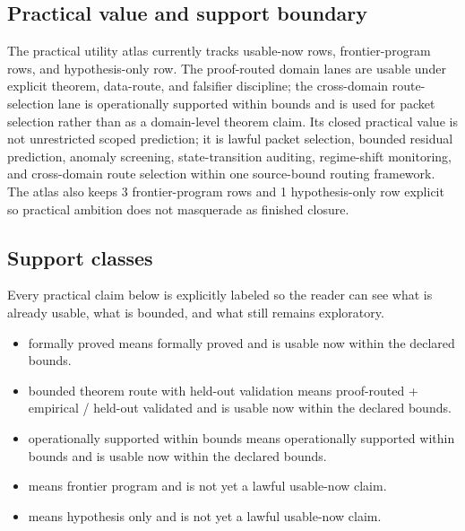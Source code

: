 \subsection{Practical value and support boundary}
The practical utility atlas currently tracks  usable-now rows,  frontier-program rows, and  hypothesis-only row.
The proof-routed domain lanes are usable under explicit theorem, data-route, and falsifier discipline; the cross-domain route-selection lane is operationally supported within bounds and is used for packet selection rather than as a domain-level theorem claim.
Its closed practical value is not unrestricted scoped prediction; it is lawful packet selection, bounded residual prediction, anomaly screening, state-transition auditing, regime-shift monitoring, and cross-domain route selection within one source-bound routing framework.
The atlas also keeps 3 frontier-program rows and 1 hypothesis-only row explicit so practical ambition does not masquerade as finished closure.

\subsection{Support classes}
Every practical claim below is explicitly labeled so the reader can see what is already usable, what is bounded, and what still remains exploratory.
\begin{itemize}[leftmargin=1.6em,nosep]
\item formally proved means formally proved and is usable now within the declared bounds.
\item bounded theorem route with held-out validation means proof-routed + empirical / held-out validated and is usable now within the declared bounds.
\item operationally supported within bounds means operationally supported within bounds and is usable now within the declared bounds.
\item {} means frontier program and is not yet a lawful usable-now claim.
\item {} means hypothesis only and is not yet a lawful usable-now claim.
\end{itemize}

